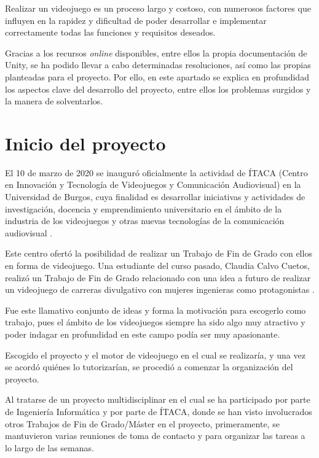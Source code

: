  \label{cap:aspectos}
Realizar un videojuego es un proceso largo y costoso, con numerosos factores que influyen en la rapidez y dificultad de poder desarrollar e implementar correctamente todas las funciones y requisitos deseados.

Gracias a los recursos \textit{online} disponibles, entre ellos la propia documentación de Unity, se ha podido llevar a cabo determinadas resoluciones, así como las propias planteadas para el proyecto. Por ello, en este apartado se explica en profundidad los aspectos clave del desarrollo del proyecto, entre ellos los problemas surgidos y la manera de solventarlos.

\section{Inicio del proyecto}

El 10 de marzo de 2020 se inauguró oficialmente la actividad de ÍTACA (Centro en Innovación y Tecnología de Videojuegos y Comunicación Audiovisual) en la Universidad de Burgos, cuya finalidad es desarrollar iniciativas y actividades de investigación, docencia y emprendimiento universitario en el ámbito de la industria de los videojuegos y otras nuevas tecnologías de la comunicación audiovisual \cite{itaca}.

Este centro ofertó la posibilidad de realizar un Trabajo de Fin de Grado con ellos en forma de videojuego. Una estudiante del curso pasado, Claudia Calvo Cuetos, realizó un Trabajo de Fin de Grado relacionado con una idea a futuro de realizar un videojuego de carreras divulgativo con mujeres ingenieras como protagonistas \cite{itaca:tfg}. 

Fue este llamativo conjunto de ideas y forma la motivación para escogerlo como trabajo, pues el ámbito de los videojuegos siempre ha sido algo muy atractivo y poder indagar en profundidad en este campo podía ser muy apasionante.

Escogido el proyecto y el motor de videojuego en el cual se realizaría, y una vez se acordó quiénes lo tutorizarían, se procedió a comenzar la organización del proyecto.

Al tratarse de un proyecto multidisciplinar en el cual se ha participado por parte de Ingeniería Informática y por parte de ÍTACA, donde se han visto involucrados otros Trabajos de Fin de Grado/Máster en el proyecto, primeramente, se mantuvieron varias reuniones de toma de contacto y para organizar las tareas a lo largo de las semanas.

